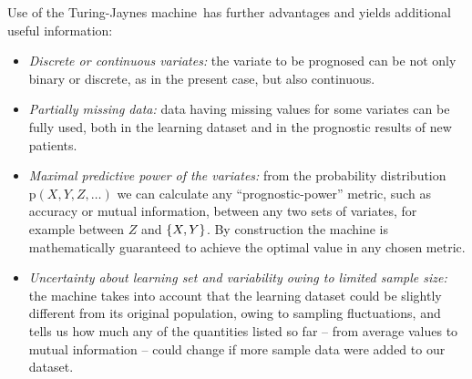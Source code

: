 \documentclass[utf8]{FrontiersinHarvard} %
\DeclarePairedDelimiter\set{\{}{\}} %
\newcommand*{\p}{\mathrm{p}}%
\renewcommand*{\|}[1][]{\nonscript\:#1\vert\nonscript\:\mathopen{}}
\newcommand*{\tjm}{Turing-Jaynes machine}
\begin{document}
Use of the \tjm\ has further advantages and yields additional useful information:
\begin{itemize}
\item \emph{Discrete or continuous variates:} the variate to be prognosed can be not only binary or discrete, as in the present case, but also continuous.
\item \emph{Partially missing data:} data having missing values for some variates can be fully used, both in the learning dataset and in the prognostic results of new patients.
\item \emph{Maximal predictive power of the variates:} from the probability distribution $\p(X,Y,Z,\dotsc)$ we can calculate any  \enquote{prognostic-power} metric, such as accuracy or  mutual information, between any two sets of variates, for example between $Z$ and $\set{X,Y}$. By construction the machine is mathematically guaranteed to achieve the optimal value in any chosen metric. %
\item \emph{Uncertainty about learning set and variability owing to limited sample size:} the machine takes into account that the learning dataset could be slightly different from its original population, owing to sampling fluctuations, and tells us how much any of the quantities listed so far -- from average values to mutual information -- could change if more sample data were added to our dataset.
\end{itemize}

\medskip
\end{document}
